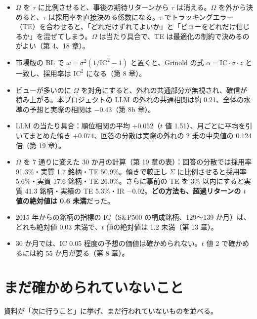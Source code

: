 \documentclass[xelatex,ja=standard,jafont=haranoaji,a4paper,10pt,openany]{bxjsreport}
\newcommand{\SP}{S\&P500}
\newcommand{\IC}{\mathrm{IC}}
\begin{document}
\begin{factbox}
\begin{itemize}
\item $\Omega$ を $\tau$ に比例させると、事後の期待リターンから $\tau$ は消える。$\Omega$ を外から決めると、$\tau$ は採用率を直接決める係数になる。$\tau$ でトラッキングエラー（TE）を合わせると、「どれだけずれてよいか」と「ビューをどれだけ信じるか」を混ぜてしまう。$\Omega$ は当たり具合で、TE は最適化の制約で決めるのがよい（第 4、18 章）。
\item 市場版の BL で $\omega=\sigma^2(1/\IC^2-1)$ と置くと、Grinold の式 $\alpha=\IC\cdot\sigma\cdot z$ と一致し、採用率は $\IC^2$ になる（第 8 章）。
\item ビューが多いのに $\Omega$ を対角にすると、外れの共通部分が無視され、確信が積み上がる。本プロジェクトの LLM の外れの共通相関は約 0.21、全体の水準の予想と実際の相関は $-0.43$（第 8b 章）。
\item LLM の当たり具合：順位相関の平均 $+0.052$（$t$ 値 1.51）、月ごとに平均を引いてまとめた傾き $+0.074$、回答の分散は実際の外れの 2 乗の中央値の 0.124 倍（第 19 章）。
\item $\Omega$ を 7 通りに変えた 30 か月の計算（第 19 章の表）：回答の分散では採用率 91.3\%・実質 1.7 銘柄・TE 50.9\%。傾きで較正し $\Sigma$ に比例させると採用率 5.6\%・実質 17.6 銘柄・TE 26.0\%。さらに事前の TE を 3\% 以内にすると実質 41.3 銘柄・実績の TE 5.3\%・IR $-0.02$。\textbf{どの方法も、超過リターンの $t$ 値の絶対値は 0.6 未満}だった。
\item 2015 年からの銘柄の指標の IC（\SP{} の構成銘柄、129〜139 か月）は、どれも絶対値 0.03 未満で、$t$ 値の絶対値は 1.2 未満（第 13 章）。
\item 30 か月では、IC 0.05 程度の予想の価値は確かめられない。$t$ 値 2 で確かめるには約 55 か月が要る（第 8 章）。
\end{itemize}
\end{factbox}

\section{まだ確かめられていないこと}

資料が「次に行うこと」に挙げ、まだ行われていないものを並べる。
\end{document}

